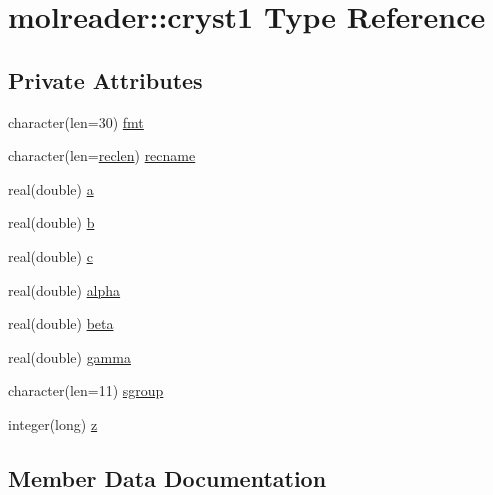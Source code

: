 \hypertarget{structmolreader_1_1cryst1}{}\section{molreader\+:\+:cryst1 Type Reference}
\label{structmolreader_1_1cryst1}
\subsection*{Private Attributes}
\begin{DoxyCompactItemize}
\item 
character(len=30) \hyperlink{structmolreader_1_1cryst1_ab6ab864b10676c184026f298e2298135}{fmt}
\item 
character(len=\hyperlink{namespacemolreader_a8f12be3272b946fd698c9fbaf2ba9d32}{reclen}) \hyperlink{structmolreader_1_1cryst1_ae85e046760ae97562351b100fd2c9034}{recname}
\item 
real(double) \hyperlink{structmolreader_1_1cryst1_a85327bed083d1034112fc1bc78efd7e0}{a}
\item 
real(double) \hyperlink{structmolreader_1_1cryst1_a0cedac0856256f960f563ea0e3d57945}{b}
\item 
real(double) \hyperlink{structmolreader_1_1cryst1_a6269ff5021092d6d0b0185cda1572489}{c}
\item 
real(double) \hyperlink{structmolreader_1_1cryst1_a6186be5cb316849fcb7cfca0ec9c6358}{alpha}
\item 
real(double) \hyperlink{structmolreader_1_1cryst1_a0c69e8f33d0711ee345d6bfc3212e671}{beta}
\item 
real(double) \hyperlink{structmolreader_1_1cryst1_a5830f0c34f6ad1c07482a203f7a7b175}{gamma}
\item 
character(len=11) \hyperlink{structmolreader_1_1cryst1_a689985667a15167b26dee5b87a240333}{sgroup}
\item 
integer(long) \hyperlink{structmolreader_1_1cryst1_ae973dda59fd038efc49c8a247e3e71c9}{z}
\end{DoxyCompactItemize}


\subsection{Member Data Documentation}
\mbox{\label{structmolreader_1_1cryst1_a85327bed083d1034112fc1bc78efd7e0}} 
